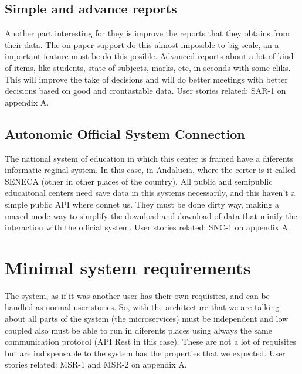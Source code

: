 \subsection{Simple and advance reports}

Another part interesting for they is improve the reports that they obtains from
their data. The on paper support do this almost imposible to big scale, an a
important feature must be do this posible. Advanced reports about a lot of kind
of items, like students, state of subjects, marks, etc, in seconds with some cliks.
This will improve the take of decisions and will do better meetings with better
decisions based on good and crontastable data.
\intro
User stories related: SAR-1 on appendix A.

\subsection{Autonomic Official System Connection}

The national system of education in which this center is framed have a diferents
informatic reginal system. In this case, in Andalucia, where the certer is it called
SENECA (other in other places of the country). All public and semipublic educaitonal
centers need save data in this systems necessarily, and this haven't a simple public
API where connet us. They must be done dirty way, making a maxed mode way to simplify
the download and download of data that minify the interaction with the official system.
\intro
User stories related: SNC-1 on appendix A.

\section{Minimal system requirements}

The system, as if it was another user has their own requisites,
and can be handled as normal user stories.
So, with the architecture that we are talking about all parts of the system
(the microservices) must be independent and low coupled also must be able to run
in diferents places using always the same communication protocol (API Rest in this case).
These are not a lot of requisites but are indispensable to the system has the properties
that we expected.
\intro
User stories related: MSR-1 and MSR-2 on appendix A.
